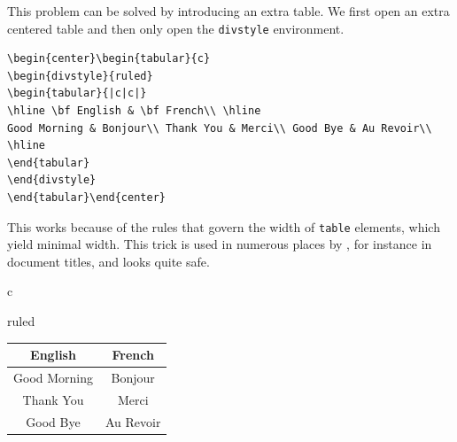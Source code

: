 This problem can be solved by introducing an extra table.
We first open an extra centered table and then only open the
\texttt{divstyle} environment.
\begin{verbatim}
\begin{center}\begin{tabular}{c}
\begin{divstyle}{ruled}
\begin{tabular}{|c|c|}
\hline \bf English & \bf French\\ \hline
Good Morning & Bonjour\\ Thank You & Merci\\ Good Bye & Au Revoir\\
\hline
\end{tabular}
\end{divstyle}
\end{tabular}\end{center}
\end{verbatim}
This works because of the rules that
govern the width of {\html} \verb+table+ elements, which yield
minimal width. This trick is used in
numerous places by \hevea{}, for instance in document titles, and looks
quite safe.
\begin{htmlonly}
\begin{center}\begin{tabular}{c}
\begin{divstyle}{ruled}
\begin{tabular}{|c|c|}
\hline \bf English & \bf French\\ \hline
Good Morning & Bonjour\\ Thank You & Merci\\ Good Bye & Au Revoir\\
\hline
\end{tabular}
\end{divstyle}
\end{tabular}\end{center}
\end{htmlonly}


